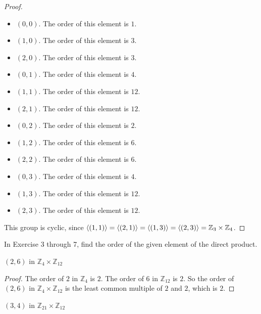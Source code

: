 \begin{proof}
    \begin{itemize}
        \item $(0, 0)$. The order of this element is $1$.
        \item $(1, 0)$. The order of this element is $3$.
        \item $(2, 0)$. The order of this element is $3$.
        \item $(0, 1)$. The order of this element is $4$.
        \item $(1, 1)$. The order of this element is $12$.
        \item $(2, 1)$. The order of this element is $12$.
        \item $(0, 2)$. The order of this element is $2$.
        \item $(1, 2)$. The order of this element is $6$.
        \item $(2, 2)$. The order of this element is $6$.
        \item $(0, 3)$. The order of this element is $4$.
        \item $(1, 3)$. The order of this element is $12$.
        \item $(2, 3)$. The order of this element is $12$.
    \end{itemize}

    This group is cyclic, since $\left\langle{(1,1)}\right\rangle = \left\langle{(2,1)}\right\rangle = \left\langle{(1,3)}\right\rangle = \left\langle{(2,3)}\right\rangle = \mathbb{Z}_{3}\times\mathbb{Z}_{4}$.
\end{proof}

In Exercise 3 through 7, find the order of the given element of the direct product.

\newpage
\begin{exercise}
    $(2,6)$ in $\mathbb{Z}_{4}\times\mathbb{Z}_{12}$
\end{exercise}

\begin{proof}
    The order of $2$ in $\mathbb{Z}_{4}$ is $2$. The order of $6$ in $\mathbb{Z}_{12}$ is $2$. So the order of $(2,6)$ in $\mathbb{Z}_{4}\times\mathbb{Z}_{12}$ is the least common multiple of $2$ and $2$, which is $2$.
\end{proof}

\newpage
\begin{exercise}
    $(3,4)$ in $\mathbb{Z}_{21}\times\mathbb{Z}_{12}$
\end{exercise}


